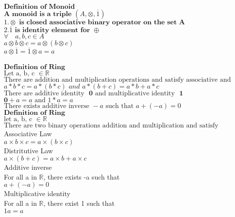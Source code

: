 \documentclass[10pt]{article}
\begin{document}
$\textbf{Definition of Monoid } $\\
$\textbf{A monoid is a triple } (A, \otimes, \overline{1})$\\
$1. \otimes \textbf{ is closed associative binary operator on the set A}$\\
$2. \overline{1} \textbf{ is identity element for } \oplus$\\
$\forall\quad a, b, c \in A$\\
$ a \otimes b  \otimes c = a \otimes (b \otimes c) $\\
$ a \otimes \overline{1} = \overline{1} \otimes a =  a$\\
\\

$\textbf{Definition of Ring}$\\
$\text{Let a, b, c }\in  \mathbb{R}$\\
$\text{There are addition and multiplication operations and satisfy associative and distributive laws}$\\
$a*b*c = a*(b*c) \textit{ and }  a*(b+c) = a*b + a*c$\\
$\text{There are additive identity } \textbf{ 0 } \text{and multiplicative identity } \textbf{ 1 }$\\
$\textbf{0} + a = a \text{ and }1*a = a$\\
$\text{There exists additive inverse } -a \text{ such that } a + (-a) = 0$\\

$\textbf{Definition of Ring}$\\
$\text{let a, b, c } \in \mathbb{R}$\\
$\text{There are two binary operations addition and multiplication and satisfy }$\\

Associative Law\\
$ a \times b \times c = a \times (b \times c) $\\

Distritutive Law\\
$a \times (b + c) = a \times b + a \times c $\\

Additive inverse\\
For all a in $\mathbb{R}$, there exists -a such that\\
$a + (-a) = 0$\\

Multiplicative identity \\
For all a in $\mathbb{R}$, there exist 1 such that\\
$1a = a$ \\
\end{document}
